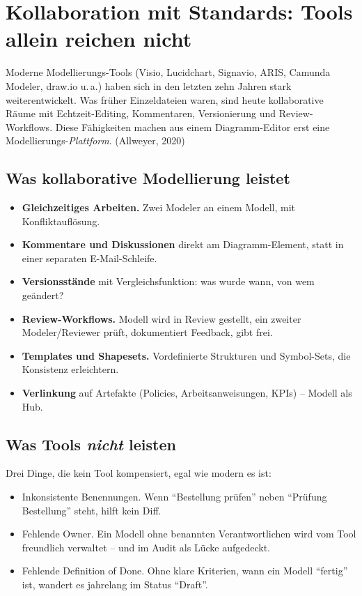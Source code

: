 \documentclass[11pt,a4paper,oneside]{article}
\newcommand{\fachbegriff}[1]{\textbf{#1}}
\newcommand{\quelle}[1]{{\footnotesize\color{lpGray}(#1)}}
\begin{document}
\section{Kollaboration mit Standards: Tools allein reichen nicht}

Moderne Modellierungs-Tools (Visio, Lucidchart, Signavio, ARIS, Camunda Modeler, draw.io u.\,a.) haben sich in den letzten zehn Jahren stark weiterentwickelt. Was früher Einzeldateien waren, sind heute kollaborative Räume mit Echtzeit-Editing, Kommentaren, Versionierung und Review-Workflows. Diese Fähigkeiten machen aus einem Diagramm-Editor erst eine Modellierungs-\emph{Plattform}. \quelle{Allweyer, 2020}

\subsection{Was kollaborative Modellierung leistet}

\begin{itemize}
  \item \fachbegriff{Gleichzeitiges Arbeiten.} Zwei Modeler an einem Modell, mit Konfliktauflösung.
  \item \fachbegriff{Kommentare und Diskussionen} direkt am Diagramm-Element, statt in einer separaten E-Mail-Schleife.
  \item \fachbegriff{Versionsstände} mit Vergleichsfunktion: was wurde wann, von wem geändert?
  \item \fachbegriff{Review-Workflows.} Modell wird in Review gestellt, ein zweiter Modeler/Reviewer prüft, dokumentiert Feedback, gibt frei.
  \item \fachbegriff{Templates und Shapesets.} Vordefinierte Strukturen und Symbol-Sets, die Konsistenz erleichtern.
  \item \fachbegriff{Verlinkung} auf Artefakte (Policies, Arbeitsanweisungen, KPIs) -- Modell als Hub.
\end{itemize}

\subsection{Was Tools \emph{nicht} leisten}

Drei Dinge, die kein Tool kompensiert, egal wie modern es ist:

\begin{itemize}
  \item Inkonsistente Benennungen. Wenn ``Bestellung prüfen'' neben ``Prüfung Bestellung'' steht, hilft kein Diff.
  \item Fehlende Owner. Ein Modell ohne benannten Verantwortlichen wird vom Tool freundlich verwaltet -- und im Audit als Lücke aufgedeckt.
  \item Fehlende Definition of Done. Ohne klare Kriterien, wann ein Modell ``fertig'' ist, wandert es jahrelang im Status ``Draft''.
\end{itemize}
\end{document}
